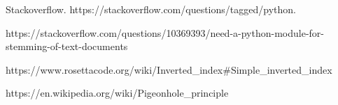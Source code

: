 \documentclass[a4paper, 11pt]{article}
\begin{document}
\begin{thebibliography}{9}

\bibitem{} 
Stackoverflow. https://stackoverflow.com/questions/tagged/python.

\bibitem{} 
https://stackoverflow.com/questions/10369393/need-a-python-module-for-stemming-of-text-documents

\bibitem{}
https://www.rosettacode.org/wiki/Inverted\_index#Simple\_inverted\_index

\bibitem{}
https://en.wikipedia.org/wiki/Pigeonhole\_principle


\end{thebibliography}
\end{document}
